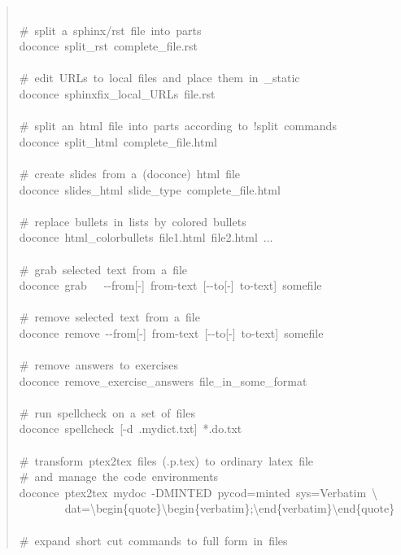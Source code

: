 \documentclass[a4paper]{article}
\begin{document}
\begin{quote}
{~\\
\#~split~a~sphinx/rst~file~into~parts\\
doconce~split\_rst~complete\_file.rst\\
~\\
\#~edit~URLs~to~local~files~and~place~them~in~\_static\\
doconce~sphinxfix\_local\_URLs~file.rst\\
~\\
\#~split~an~html~file~into~parts~according~to~!split~commands\\
doconce~split\_html~complete\_file.html\\
~\\
\#~create~slides~from~a~(doconce)~html~file\\
doconce~slides\_html~slide\_type~complete\_file.html\\
~\\
\#~replace~bullets~in~lists~by~colored~bullets\\
doconce~html\_colorbullets~file1.html~file2.html~...\\
~\\
\#~grab~selected~text~from~a~file\\
doconce~grab~~~-{}-from{[}-{]}~from-text~{[}-{}-to{[}-{]}~to-text{]}~somefile\\
~\\
\#~remove~selected~text~from~a~file\\
doconce~remove~-{}-from{[}-{]}~from-text~{[}-{}-to{[}-{]}~to-text{]}~somefile\\
~\\
\#~remove~answers~to~exercises\\
doconce~remove\_exercise\_answers~file\_in\_some\_format\\
~\\
\#~run~spellcheck~on~a~set~of~files\\
doconce~spellcheck~{[}-d~.mydict.txt{]}~*.do.txt\\
~\\
\#~transform~ptex2tex~files~(.p.tex)~to~ordinary~latex~file\\
\#~and~manage~the~code~environments\\
doconce~ptex2tex~mydoc~-DMINTED~pycod=minted~sys=Verbatim~\textbackslash{}\\
~~~~~~~~dat=\textbackslash{}begin\{quote\}\textbackslash{}begin\{verbatim\};\textbackslash{}end\{verbatim\}\textbackslash{}end\{quote\}\\
~\\
\#~expand~short~cut~commands~to~full~form~in~files\\
}
\end{quote}
\end{document}
